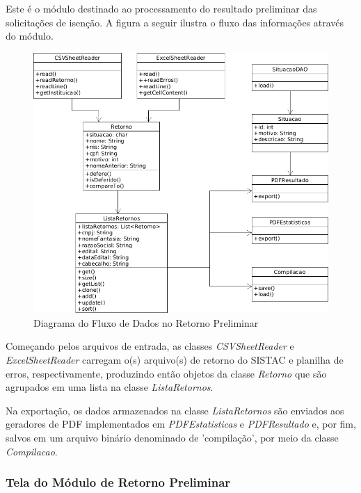 \documentclass[
	12pt,			%
	openright,		%
	oneside,	
	a4paper,		%
	english,		%
	brazil			%
]{abntex2/abntex2}  %
\begin{document}
					Este é o módulo destinado ao processamento do resultado preliminar das solicitações de isenção. A figura a seguir ilustra o fluxo das informações através do módulo.
	
					\clearpage
					\begin{figure}[ht]
						\begin{center}
							
							\caption{Diagrama do Fluxo de Dados no Retorno Preliminar}
							\includegraphics[scale=0.5]{img/retorno-prelim-uml}
							
						\end{center}
					\end{figure}
	
					Começando pelos arquivos de entrada, as classes \textit{CSVSheetReader} e \textit{ExcelSheetReader} carregam o(s) arquivo(s) de retorno do SISTAC e planilha de erros, respectivamente, produzindo então objetos da classe \textit{Retorno} que são agrupados em uma lista na classe \textit{ListaRetornos}.
	
					Na exportação, os dados armazenados na classe \textit{ListaRetornos} são enviados aos geradores de PDF implementados em \textit{PDFEstatisticas} e \textit{PDFResultado} e, por fim, salvos em um arquivo binário denominado de 'compilação', por meio da classe \textit{Compilacao}.
	
				\subsubsection{Tela do Módulo de Retorno Preliminar}
	
\end{document}
